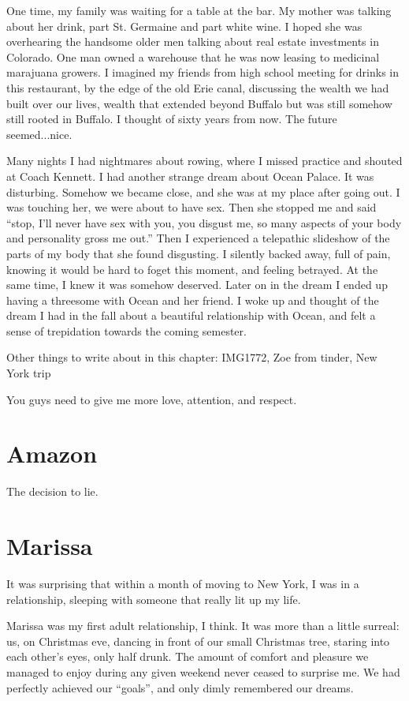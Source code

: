One time, my family was waiting for a table at the bar.  My mother was talking
about her drink, part St. Germaine and part white wine.  I hoped she was
overhearing the handsome older men talking about real estate investments in
Colorado.  One man owned a warehouse that he was now leasing to medicinal
marajuana growers.  I imagined my friends from high school meeting for drinks in
this restaurant, by the edge of the old Erie canal, discussing the wealth we had
built over our lives, wealth that extended beyond Buffalo but was still somehow
still rooted in Buffalo.  I thought of sixty years from now.  The future
seemed...nice.

Many nights I had nightmares about rowing, where I missed practice and shouted
at Coach Kennett.  I had another strange dream about Ocean Palace.  It was
disturbing.  Somehow we became close, and she was at my place after going out.
I was touching her, we were about to have sex.  Then she stopped me and said
``stop, I'll never have sex with you, you disgust me, so many aspects of your
body and personality gross me out.''  Then I experienced a telepathic slideshow
of the parts of my body that she found disgusting.  I silently backed away, full
of pain, knowing it would be hard to foget this moment, and feeling betrayed.
At the same time, I knew it was somehow deserved.  Later on in the dream I ended
up having a threesome with Ocean and her friend.  I woke up and thought of the
dream I had in the fall about a beautiful relationship with Ocean, and felt a
sense of trepidation towards the coming semester.

Other things to write about in this chapter: IMG1772, Zoe from tinder, New York
trip

You guys need to give me more love, attention, and respect.

\chapter{Amazon}
The decision to lie.

\chapter{Marissa}
It was surprising that within a month of moving to New York, I was in a
relationship, sleeping with someone that really lit up my life.

Marissa was my first adult relationship, I think.  It was more than a little
surreal: us, on Christmas eve, dancing in front of our small Christmas tree,
staring into each other's eyes, only half drunk.  The amount of comfort and
pleasure we managed to enjoy during any given weekend never ceased to surprise
me.  We had perfectly achieved our ``goals'', and only dimly remembered our
dreams.

